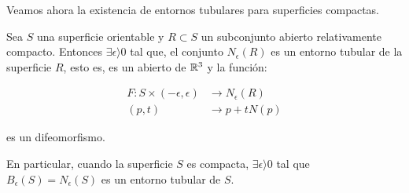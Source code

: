 Veamos ahora la existencia de entornos tubulares para superficies compactas.
\begin{theorem}
Sea $S$ una superficie orientable y $R \subset S$ un subconjunto abierto relativamente compacto. Entonces $\exists \epsilon  \rangle  0$ tal que, el conjunto $N_\epsilon(R)$ es un entorno tubular de la superficie $R$, esto es, es un abierto de $\mathbb{R}^3$ y la función:

\begin{align*}
    F: S \times (-\epsilon, \epsilon) &\longrightarrow N_\epsilon(R) \\
    (p,t) &\longrightarrow p + tN(p)
\end{align*}

es un difeomorfismo.

En particular, cuando la superficie $S$ es compacta, $\exists \epsilon  \rangle  0$ tal que
$B_\epsilon(S)=N_\epsilon(S)$ es un entorno tubular de $S$.
\end{theorem}
